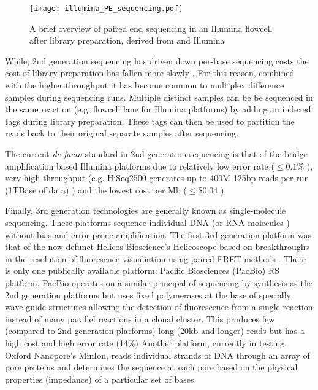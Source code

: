 \begin{figure}
    \texttt{[image: illumina\_PE\_sequencing.pdf]}
    \caption[Overview of paired-end sequencing]{A brief overview of paired end sequencing in an Illumina flowcell after library preparation, derived
    from \citep{Mardis2008} and Illumina}
    \label{fig:libseq}
\end{figure}

While, 2nd generation sequencing has driven down per-base sequencing costs the cost of library preparation 
has fallen more slowly \citep{Blainey2013}.
For this reason, combined with the higher throughput it has become common to multiplex difference samples 
during sequencing runs.  Multiple distinct samples can be be sequenced
in the same reaction (e.g. flowcell lane for Illumina platforms) by adding an indexed tags during library
preparation.  These tags can then be used to partition the reads back to their original separate samples
after sequencing. 

The current \textit{de facto} standard in 2nd generation sequencing is that of the bridge amplification
based \citep{Shendure2008} Illumina platforms \citep{Regalado2014} due to relatively low error rate (\(\leq0.1\%\) \citep{Glenn2011}),
very high throughput (e.g. HiSeq2500 generates up to 400M 125bp reads per run (1TBase of data) \citep{Nederbragt2013})
and the lowest cost per Mb (\(\leq\$0.04\) \citep{Glenn2011}).


Finally, 3rd generation technologies are generally known as single-molecule sequencing.
These platforms sequence individual DNA (or RNA molecules \citep{Ozsolak2009}) without
bias and error-prone amplification. 
The first 3rd generation platform was that of the now defunct Helicos Bioscience's Helicoscope \citep{Harris2008}
based on breakthroughs in the resolution of fluoresence visualiation using paired FRET methods \citep{Braslavsky2003}.
There is only one publically available platform: Pacific Biosciences (PacBio) RS platform. PacBio operates on a similar principal
of sequencing-by-synthesis as the 2nd generation platforms but uses fixed polymerases at the base
of specially wave-guide structures allowing the detection of fluorescence from a single reaction
instead of many parallel reactions in a clonal cluster.  This produces few (compared to 2nd generation 
platforms) long (20kb and longer) reads but has a high cost and high error rate (14\%) \citep{Jaszczyszyn2014}
Another platform, currently in testing, Oxford Nanopore's MinIon, reads individual strands of DNA through an array of 
pore proteins and determines the sequence at each pore based on the physical
properties (impedance) of a particular set of bases.

